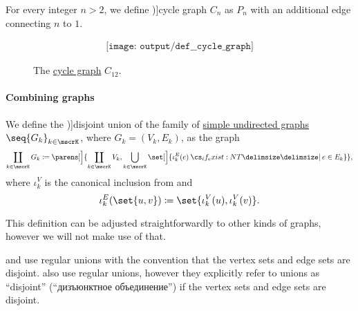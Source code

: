 \begin{definition}\label{def:cycle_graph}
  For every integer \( n > 2 \), we define \term[en=cycle graph (\cite[532]{Rosen1999})]{cycle graph} \( C_n \) as \hyperref[def:path_graph]{\( P_n \)} with an additional edge connecting \( n \) to \( 1 \).

  \begin{figure}[!ht]
    \begin{equation}\label{eq:fig:def:cycle_graph/c12}
      \begin{aligned}
        \texttt{[image: output/def\_\_cycle\_graph]}
      \end{aligned}
    \end{equation}
    \caption{The \hyperref[def:cycle_graph]{cycle graph} \( C_{12} \).}\label{fig:def:cycle_graph/c12}
  \end{figure}
\end{definition}

\paragraph{Combining graphs}

\begin{definition}\label{def:graph_disjoint_union}\mimprovised
  We define the \term[ru=дизъюнктное объедиение (графов) (\cite[19]{Емеличев1990})]{disjoint union} of the family of \hyperref[def:undirected_graph]{simple undirected graphs} \( \seq{ G_k }_{k \in \mscrK} \), where \( G_k = (V_k, E_k) \), as the graph
  \begin{equation*}
    \coprod_{k \in \mscrK} G_k \coloneqq \parens[\Big]{ \coprod_{k \in \mscrK} V_k, \bigcup_{k \in \mscrK} \set[\Big]{ \iota_k^E(e) \given* e \in E_k } },
  \end{equation*}
  where \( \iota_k^V \) is the canonical inclusion from  and
  \begin{equation*}
    \iota_k^E(\set{ u, v }) \coloneqq \set{ \iota_k^V(u), \iota_k^V(v) }.
  \end{equation*}
\end{definition}
\begin{comments}
  \item This definition can be adjusted straightforwardly to other kinds of graphs, however we will not make use of that.
  \item {} and  use regular unions with the convention that the vertex sets and edge sets are disjoint.  also use regular unions, however they explicitly refer to unions as \enquote{disjoint} (\enquote{дизъюнктное объединение}) if the vertex sets and edge sets are disjoint.
\end{comments}

